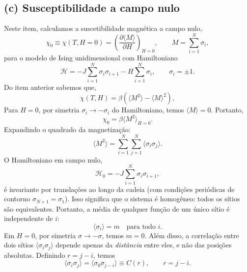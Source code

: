 \documentclass[11pt,a4paper]{article}
\begin{document}
\subsection*{(c) Susceptibilidade a campo nulo}
%
Neste item, calculamos a suscetibilidade magnética a campo nulo,
\begin{equation}
    \chi_0 \equiv \chi(T, H=0) = \left( \frac{\partial \langle M \rangle}{\partial H} \right)_{H=0},
    \qquad M = \sum_{i=1}^N \sigma_i,
\end{equation}
para o modelo de Ising unidimensional com Hamiltoniano
\begin{equation}
    \mathcal H = -J \sum_{i=1}^N \sigma_i \sigma_{i+1} - H \sum_{i=1}^N \sigma_i,
    \qquad \sigma_i = \pm 1.
\end{equation}
%
Do item anterior sabemos que,
%
\begin{equation}
    \chi(T, H) = \beta \left( \langle M^2 \rangle - \langle M \rangle^2 \right),
\end{equation}
%
Para $H = 0$, por simetria $\sigma_i \to -\sigma_i$ do Hamiltoniano, temos $\langle M \rangle = 0$. Portanto,
\begin{equation}
    \chi_0 = \beta \langle M^2 \rangle_{H=0}.
    \label{eq:chi_fluctuacao}
\end{equation}
%
Expandindo o quadrado da magnetização:
%
\begin{equation}
    \langle M^2 \rangle = \sum_{i=1}^N \sum_{j=1}^N \langle \sigma_i \sigma_j \rangle.
    \label{eq:M2_soma}
\end{equation}
%
O Hamiltoniano em campo nulo,
%
\begin{equation}
    \mathcal H_0 = -J \sum_{i=1}^N \sigma_i \sigma_{i+1},
\end{equation}
%
é invariante por translações ao longo da cadeia (com condições periódicas de contorno $\sigma_{N+1} = \sigma_1$). Isso significa que o sistema é homogêneo: todos os sítios são equivalentes. Portanto, a média de qualquer função de um único sítio é independente de $i$:
%
\begin{equation}
    \langle \sigma_i \rangle = m \quad \text{para todo } i.
\end{equation}
%
Em $H=0$, por simetria $\sigma \to -\sigma$, temos $m = 0$.
%
Além disso, a correlação entre dois sítios $\langle \sigma_i \sigma_j \rangle$ depende apenas da \emph{distância} entre eles, e não das posições absolutas. Definindo $r = j - i$, temos
%
\begin{equation}
    \langle \sigma_i \sigma_j \rangle = \langle \sigma_0 \sigma_{j-i} \rangle \equiv C(r),
    \qquad r = j-i.
\end{equation}
\end{document}
